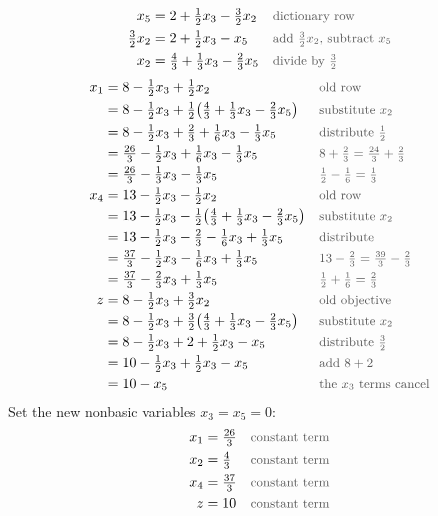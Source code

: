 \documentclass[a4paper,11pt]{article}
\newcommand{\why}[1]{\text{\small\color{black!65}#1}}
\begin{document}
\begin{align*}
x_5&=2+\tfrac12 x_3-\tfrac32 x_2&&\why{dictionary row}\\
\tfrac32 x_2&=2+\tfrac12 x_3-x_5&&\why{add $\tfrac32 x_2$, subtract $x_5$}\\
x_2&=\tfrac43+\tfrac13 x_3-\tfrac23 x_5&&\why{divide by $\tfrac32$}
\end{align*}
\begin{align*}
x_1&=8-\tfrac12 x_3+\tfrac12 x_2&&\why{old row}\\
&=8-\tfrac12 x_3+\tfrac12\bigl(\tfrac43+\tfrac13 x_3-\tfrac23 x_5\bigr)&&\why{substitute $x_2$}\\
&=8-\tfrac12 x_3+\tfrac23+\tfrac16 x_3-\tfrac13 x_5&&\why{distribute $\tfrac12$}\\
&=\tfrac{26}{3}-\tfrac12 x_3+\tfrac16 x_3-\tfrac13 x_5&&\why{$8+\tfrac23=\tfrac{24}{3}+\tfrac{2}{3}$}\\
&=\tfrac{26}{3}-\tfrac13 x_3-\tfrac13 x_5&&\why{$\tfrac12-\tfrac16=\tfrac13$}\\
x_4&=13-\tfrac12 x_3-\tfrac12 x_2&&\why{old row}\\
&=13-\tfrac12 x_3-\tfrac12\bigl(\tfrac43+\tfrac13 x_3-\tfrac23 x_5\bigr)&&\why{substitute $x_2$}\\
&=13-\tfrac12 x_3-\tfrac23-\tfrac16 x_3+\tfrac13 x_5&&\why{distribute}\\
&=\tfrac{37}{3}-\tfrac12 x_3-\tfrac16 x_3+\tfrac13 x_5&&\why{$13-\tfrac23=\tfrac{39}{3}-\tfrac{2}{3}$}\\
&=\tfrac{37}{3}-\tfrac23 x_3+\tfrac13 x_5&&\why{$\tfrac12+\tfrac16=\tfrac23$}\\
z&=8-\tfrac12 x_3+\tfrac32 x_2&&\why{old objective}\\
&=8-\tfrac12 x_3+\tfrac32\bigl(\tfrac43+\tfrac13 x_3-\tfrac23 x_5\bigr)&&\why{substitute $x_2$}\\
&=8-\tfrac12 x_3+2+\tfrac12 x_3-x_5&&\why{distribute $\tfrac32$}\\
&=10-\tfrac12 x_3+\tfrac12 x_3-x_5&&\why{add $8+2$}\\
&=10-x_5&&\why{the $x_3$ terms cancel}
\end{align*}
Set the new nonbasic variables $x_3=x_5=0$:
\begin{align*}
x_1&=\tfrac{26}{3}&&\why{constant term}\\
x_2&=\tfrac43&&\why{constant term}\\
x_4&=\tfrac{37}{3}&&\why{constant term}\\
z&=10&&\why{constant term}
\end{align*}
\end{document}
